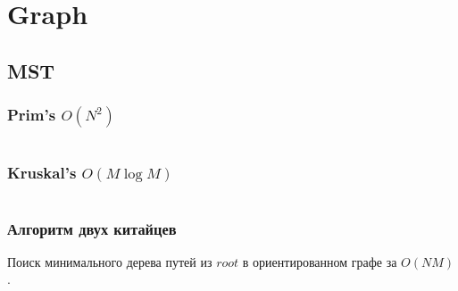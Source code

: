 \section{Graph}

\subsection{MST}
\subsubsection{Prim's $O(N^2)$}
\inputminted{cpp}{../code/graph/mst/prim.cpp}
\subsubsection{Kruskal's $O(M\log M)$}
\inputminted{cpp}{../code/graph/mst/kruskal.cpp}
\subsubsection{Алгоритм двух китайцев}
Поиск минимального дерева путей из $root$ в ориентированном графе за $O(NM)$.
\inputminted{cpp}{../code/graph/mst/directed.cpp}